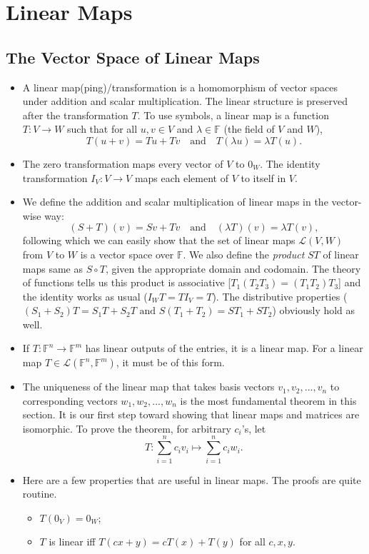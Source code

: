 \documentclass{article}
\newcommand{\F}{\mathbb{F}}
\begin{document}
\section{Linear Maps}
\subsection{The Vector Space of Linear Maps}
\begin{itemize}
    \item A linear map(ping)/transformation is a homomorphism of vector spaces under addition and scalar multiplication. The linear structure is preserved after the transformation $T$. To use symbols, a linear map is a function $T: V \rightarrow W$ such that for all $u,v \in V$ and $\lambda \in \F$ (the field of $V$ and $W$),
    \begin{equation*}
        T(u+v) = Tu + Tv \quad \text{and} \quad
        T (\lambda u) = \lambda T(u).
    \end{equation*}
    \item The zero transformation maps every vector of $V$ to $0_W$. The identity transformation $I_V: V \rightarrow V$ maps each element of $V$ to itself in $V$.
    \item We define the addition and scalar multiplication of linear maps in the vector-wise way: $$(S+T)(v) = Sv + Tv \quad \text{and} \quad (\lambda T)(v) = \lambda T(v),$$ following which we can easily show that the set of linear maps $\mathcal{L}(V,W)$ from $V$ to $W$ is a vector space over $\F$. We also define the \textit{product} $ST$ of linear maps same as $S \circ T$, given the appropriate domain and codomain. The theory of functions tells us this product is associative [$T_1(T_2 T_3) = (T_1 T_2) T_3$] and the identity works as usual ($I_W T = T I_V = T$). The distributive properties ($(S_1 + S_2) T = S_1 T + S_2 T \text{ and } S(T_1 + T_2) = S T_1 + S T_2$) obviously hold as well.
    \item If $T: \F^n \to \F^m$ has linear outputs of the entries, it is a linear map. For a linear map $T \in \mathcal{L}(\F^n,\F^m)$, it must be of this form.
    \item The uniqueness of the linear map that takes basis vectors $v_1, v_2, ..., v_n$ to corresponding vectors $w_1, w_2, ..., w_n$ is the most fundamental theorem in this section. It is our first step toward showing that linear maps and matrices are isomorphic. To prove the theorem, for arbitrary $c_i$'s, let $$T: \sum_{i=1}^n c_i v_i \mapsto \sum_{i=1}^n c_i w_i.$$
    \item Here are a few properties that are useful in linear maps. The proofs are quite routine.
    \begin{itemize}
        \item $T(0_V) = 0_W;$
        \item $T$ is linear iff $T(cx+y) = cT(x) + T(y)$ for all $c,x,y.$
    \end{itemize}
\end{itemize}
\end{document}
